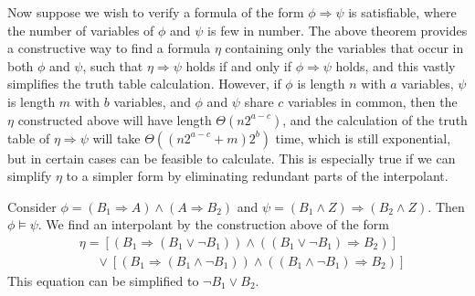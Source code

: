 Now suppose we wish to verify a formula of the form $\phi \Rightarrow \psi$ is satisfiable, where the number of variables of $\phi$ and $\psi$ is few in number. The above theorem provides a constructive way to find a formula $\eta$ containing only the variables that occur in both $\phi$ and $\psi$, such that $\eta \Rightarrow \psi$ holds if and only if $\phi \Rightarrow \psi$ holds, and this vastly simplifies the truth table calculation. However, if $\phi$ is length $n$ with $a$ variables, $\psi$ is length $m$ with $b$ variables, and $\phi$ and $\psi$ share $c$ variables in common, then the $\eta$ constructed above will have length $\Theta(n2^{a-c})$, and the calculation of the truth table of $\eta \Rightarrow \psi$ will take $\Theta((n2^{a-c} + m)2^b)$ time, which is still exponential, but in certain cases can be feasible to calculate. This is especially true if we can simplify $\eta$ to a simpler form by eliminating redundant parts of the interpolant.

\begin{example}
    Consider $\phi = (B_1 \Rightarrow A) \wedge (A \Rightarrow B_2)$ and $\psi = (B_1 \wedge Z) \Rightarrow (B_2 \wedge Z)$. Then $\phi \vDash \psi$. We find an interpolant by the construction above of the form
    \begin{align*}
        &\eta = [(B_1 \Rightarrow (B_1 \vee \neg B_1)) \wedge ((B_1 \vee \neg B_1) \Rightarrow B_2)]\\
        &\ \ \ \ \ \ \vee [(B_1 \Rightarrow (B_1 \wedge \neg B_1)) \wedge ((B_1 \wedge \neg B_1) \Rightarrow B_2)]
    \end{align*}
    This equation can be simplified to $\neg B_1 \vee B_2$.
\end{example}

